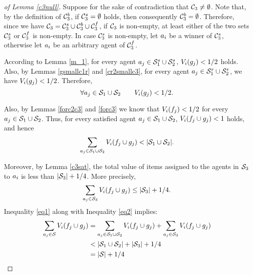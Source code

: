 \begin{proof}[of Lemma \ref{c3null}]
Suppose for the sake of contradiction that $\mathcal{C}_3 \neq \emptyset$.  Note that, by the definition of $\mathcal{C}_3^b$, if $\mathcal{C}_3^s = \emptyset$ holds, then consequently $\mathcal{C}_3^b = \emptyset$. Therefore, since we have $\mathcal{C}_3 = \mathcal{C}_3^s \cup \mathcal{C}_3^b \cup \mathcal{C}_3^f$, if $\mathcal{C}_3$ is non-empty, at least either of the two sets $\mathcal{C}_3^s$ or $\mathcal{C}_3^f$ is non-empty. In case $\mathcal{C}_3^s$ is non-empty, let $a_i$ be a winner of $\mathcal{C}_3^s$, otherwise let $a_i$ be an arbitrary agent of $\mathcal{C}_3^f$.

According to Lemma \ref{m_1}, for every agent $a_j \in \mathcal{S}_1^s \cup \mathcal{S}_2^s$, $V_i(g_j) < {1/2}$ holds. Also, by Lemmas \ref{gsmallc1r} and \ref{cr2smallc3}, for every agent  $a_j \in \mathcal{S}_1^r \cup \mathcal{S}_2^r$, we have $V_i(g_j) < {1/2}$. Therefore, 
$$\forall a_j \in \mathcal{S}_1 \cup \mathcal{S}_2 \qquad V_i(g_j) < {1/2}.$$

Also, by Lemmas \ref{forc2c3} and \ref{forc3} we know that $V_i(f_j)<{1/2}$ for every $a_j \in \mathcal{S}_1 \cup \mathcal{S}_2$. Thus, for every satisfied agent $a_j \in \mathcal{S}_1 \cup \mathcal{S}_2$, $V_i(f_j \cup g_j) <1$ holds, and hence 
\begin{equation}\label{eq1}
\sum_{a_j \in \mathcal{S}_1 \cup \mathcal{S}_2} V_i (f_j \cup g_j) < |\mathcal{S}_1 \cup \mathcal{S}_2|.
\end{equation}


Moreover, by Lemma \ref{c3sat}, the total value of items assigned to the agents in $\mathcal{S}_3$ to $a_i$ is less than $|\mathcal{S}_3| + 1/4$. More precisely,
\begin{equation}\label{eq2}
\sum_{a_j \in \mathcal{S}_3} V_i(f_j \cup g_j) \leq |\mathcal{S}_3| + 1/4.
\end{equation}
Inequality \eqref{eq1} along with Inequality \eqref{eq2} implies: 
\begin{equation}
\begin{split}
\sum_{a_j \in \mathcal{S}} V_i (f_j \cup g_j) & = \sum_{a_j \in \mathcal{S}_1 \cup \mathcal{S}_2} V_i (f_j \cup g_j) + \sum_{a_j \in \mathcal{S}_3} V_i (f_j \cup g_j)\\
& < |\mathcal{S}_1 \cup \mathcal{S}_2| + |\mathcal{S}_3| + 1/4\\
 & = |\mathcal{S} |+1/4
\end{split}
\end{equation}


\end{proof}
